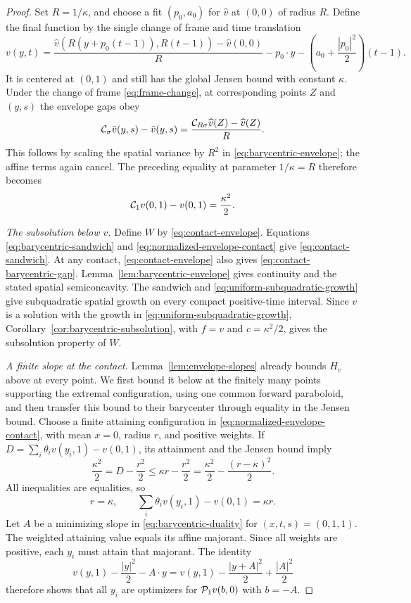 \begin{proof}
Set $R=1/\kappa$, and choose a fit $(p_0,a_0)$ for
$\widehat v$ at $(0,0)$ of radius $R$. Define the final function
by the single change of frame and time translation
\[
  v(y,t)=
   \frac{\widehat v(R(y+p_0(t-1)),R(t-1))-\widehat v(0,0)}{R}
       -p_0\cdot y
       -\left(a_0+\frac{|p_0|^2}{2}\right)(t-1).
\]
It is centered at $(0,1)$ and still has the global Jensen bound
with constant $\kappa$. Under the change of frame
\eqref{eq:frame-change}, at corresponding points $Z$ and
$(y,s)$ the envelope gaps obey
\[
  \mathcal{C}_\sigma\bar v(y,s)-\bar v(y,s)
     =\frac{\mathcal{C}_{R\sigma}\widehat v(Z)-\widehat v(Z)}{R}.
\]
This follows by scaling the spatial variance by $R^2$ in
\eqref{eq:barycentric-envelope}; the affine terms again
cancel. The preceding equality at parameter $1/\kappa=R$
therefore becomes
\begin{equation}\label{eq:normalized-envelope-contact}
  \mathcal{C}_1v(0,1)-v(0,1)=\frac{\kappa^2}{2}.
\end{equation}

\emph{The subsolution below $v$.}
Define $W$ by \eqref{eq:contact-envelope}.
Equations \eqref{eq:barycentric-sandwich} and
\eqref{eq:normalized-envelope-contact} give
\eqref{eq:contact-sandwich}. At any contact, \eqref{eq:contact-envelope}
also gives \eqref{eq:contact-barycentric-gap}.
Lemma~\ref{lem:barycentric-envelope}
gives continuity and the stated spatial semiconcavity. The
sandwich and \eqref{eq:uniform-subquadratic-growth} give
subquadratic spatial growth on every compact positive-time
interval.
Since $v$ is a solution with the growth in
\eqref{eq:uniform-subquadratic-growth},
Corollary~\ref{cor:barycentric-subsolution}, with $f=v$ and
$c=\kappa^2/2$, gives the subsolution property of $W$.

\emph{A finite slope at the contact.}
Lemma~\ref{lem:envelope-slopes} already bounds $H_v$ above at every point.
We first bound it below at the finitely many points supporting the extremal
configuration, using one common forward paraboloid, and then transfer this
bound to their barycenter through equality in the Jensen bound.
Choose a finite attaining configuration in
\eqref{eq:normalized-envelope-contact}, with mean $x=0$,
radius $r$, and positive weights. If
$D=\sum_i\theta_i v(y_i,1)-v(0,1)$, its attainment and the
Jensen bound imply
\[
  \frac{\kappa^2}{2}=D-\frac{r^2}{2}
       \le\kappa r-\frac{r^2}{2}
       =\frac{\kappa^2}{2}-\frac{(r-\kappa)^2}{2}.
\]
All inequalities are equalities, so
\begin{equation}\label{eq:contact-configuration}
  r=\kappa,\qquad
  \sum_i\theta_i v(y_i,1)-v(0,1)=\kappa r.
\end{equation}
Let $A$ be a minimizing slope in
\eqref{eq:barycentric-duality} for $(x,t,s)=(0,1,1)$.
The weighted attaining value equals its affine majorant.
Since all weights are positive, each $y_i$ must attain that
majorant. The identity
\[
  v(y,1)-\frac{|y|^2}{2}-A\cdot y
   =v(y,1)-\frac{|y+A|^2}{2}+\frac{|A|^2}{2}
\]
therefore shows that all $y_i$ are optimizers for $\mathcal{P}_1v(b,0)$ with
$b=-A$.


\end{proof}
